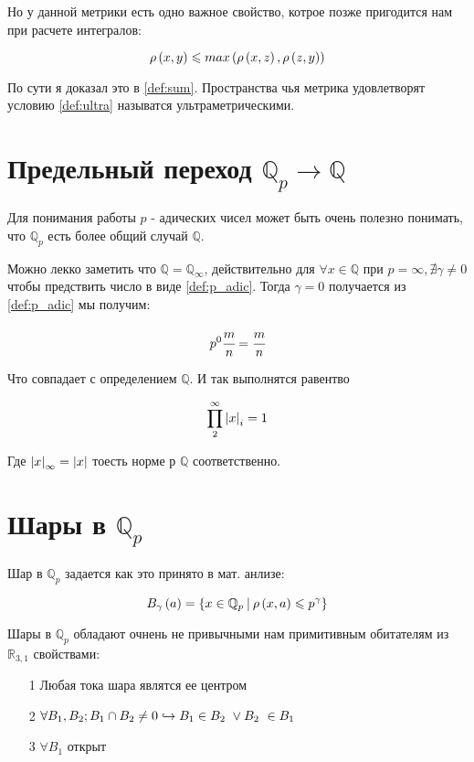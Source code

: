 Но у данной метрики есть одно важное свойство, котрое позже пригодится 
нам при расчете интегралов:

\begin{equation}
    \label{def:ultra}
    \rho \left( x, y \right) \leqslant max\left( \rho \left( x, z \right), \rho \left( z, y \right) \right)
\end{equation}

По сути я доказал это в \ref{def:sum}. Пространства 
чья метрика удовлетворят условию \ref{def:ultra} называтся 
ультраметрическими.



\section{Предельный переход $\mathbb{Q}_p \to \mathbb{Q}$}

Для понимания работы $p$ - адических чисел может быть очень полезно понимать,
что $\mathbb{Q}_p$ есть более общий случай $\mathbb{Q}$.

Можно лекко заметить что $\mathbb{Q} = \mathbb{Q}_{\infty}$, действительно для 
$\forall x \in \mathbb{Q}$ при $p = \infty, \nexists \gamma \neq 0$ 
чтобы предствить число в виде \ref{def:p_adic}. Тогда $\gamma = 0$ 
получается из \ref{def:p_adic} мы получим:

\begin{equation}
    p^0 \cfrac{m}{n} = \cfrac{m}{n}
\end{equation}

Что совпадает с определением $\mathbb{Q}$. И так выполнятся равентво

\begin{equation}
    \prod_2^{\infty} \abs{x}_i = 1
\end{equation}

Где $\abs{x}_{\infty} = \abs{x}$ тоесть норме р $\mathbb{Q}$ соответственно.

\section{Шары в $\mathbb{Q}_p$}


Шар в $\mathbb{Q}_p$ задается как это принято в мат. анлизе:

\begin{equation}
    \label{def:sp}
    B_\gamma \inner{a} = \infig{x \in \mathbb{Q}_p  \ \vline \ \rho \inner{x, a} \leq p^\gamma}
\end{equation}

Шары в $\mathbb{Q}_p$ обладают очнень не привычными нам примитивным обитателям из $\mathbb{R}_{3, 1}$ свойствами:
\begin{itemize}
    \item[1] Любая тока шара являтся ее центром
    \item[2] $\forall B_1 , B_2; B_1 \cap B_2 \neq 0 \hookrightarrow B_1 \in B_2 \ \lor B_2 \ \in B_1$
    \item[3] $\forall B_1$ открыт
\end{itemize}

